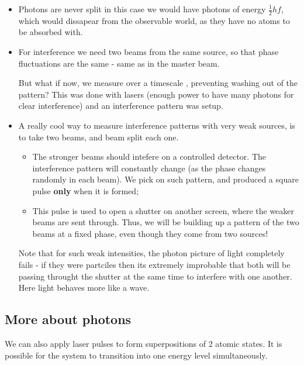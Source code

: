 \begin{itemize}
 \item Photons are never split \ira  in this case we would have photons
   of  energy  $  \frac{1}{2}hf  $,  which  would  dissapear  from  the
   observable world, as they have no atoms to be absorbed with.
 \item For interference we need two beams from the same source, so that
   phase fluctuations are the same - same as in the master beam.

\begin{framed}\noindent
  But what if now, we measure over a timescale , preventing  washing out of the  pattern?  This was
  done  with  lasers (enough  power  to  have  many photons  for  clear
  interference) and an interference pattern was setup.
\end{framed}

\item A really cool way to measure interference patterns with very weak
  sources, is to take two beams, and beam split each one.
  \begin{itemize}
  \item   The  stronger   beams   should  intefere   on  a   controlled
    detector. The  interference pattern will constantly  change (as the
    phase changes randomly in each beam).  We pick on such pattern, and
    produced a square pulse \textbf{only} when it is formed;
  \item This pulse  is used to open a shutter  on another screen, where
    the weaker beams are sent through.   Thus, we will be building up a
    pattern of  the two beams at  a fixed phase, even  though they come
    from two sources!
  \end{itemize}
  Note  that for  such weak  intensities, the  photon picture  of light
  completely  fails  -  if  they  were  partciles  then  its  extremely
  improbable that both will be passing throught the shutter at the same
  time to interfere  with one another.  Here light behaves  more like a
  wave.
\end{itemize}

 \subsection{More about photons}
 We can  also apply  laser pulses  to form  superpositions of  2 atomic
 states. It  is possible for the  system to transition into  one energy
 level simultaneously.   


